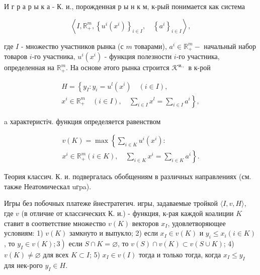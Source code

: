 \documentclass[10pt]{article}
\begin{document}
И г р а р ы к а - К. и., порожденная р ы н к м, к-рый понимается как система



\[

\left\langle I, \mathbb{R}_{+}^{m},\left\{u^{i}\left(x^{i}\right)\right\}_{i \in I}, \quad\left\{a^{i}\right\}_{i \in I}\right\rangle,

\]



где $I$ - множество участников рынка (с $m$ товарами), $a^{i} \in \mathbb{R}_{+}^{m}-$ начальный набор товаров $i$-го участника, $u^{i}\left(x^{i}\right)$ - функция полезности $i$-го участника, определенная на $\mathbb{R}_{+}^{m}$. На основе әтого рынка строится $\mathcal{K}^{\text {и., }}$ в к-рой



\[

\begin{gathered}

H=\left\{y_{I}: y_{i}=u^{l}\left(x^{i}\right) \quad(i \in I),\right. \\

\left.x^{i} \in \mathbb{R}_{+}^{m} \quad(i \in I), \quad \sum_{i \in I} x^{l}=\sum_{i \in I} a^{i}\right\},

\end{gathered}

\]



a характеристіч. функция определяется равенством



\[

\begin{gathered}

v(K)=\max \left\{\sum_{i \in K} u^{i}\left(x^{i}\right):\right. \\

\left.x^{i} \in \mathbb{R}_{+}^{m}(i \in K), \quad \sum_{i \in K} x^{i}=\sum_{i \in K} a^{i}\right\} .

\end{gathered}

\]



Теория классич. К. и. подвергалась обобщениям в различных направлениях (см. также Неатомическал uгpa).



Игры без побочных платеже йнестратегич. игры, задаваемые тройкой $\langle I, v, H\rangle$, где $v$ (в отличие от классических К. и.) - функция, к-рая каждой коалиции $K$ ставит в соответствие множество $v(K)$ векторов $x_{I}$, удовлетворяющее условиям: 1) $v(K)$ замкнуто и выпукло; 2) если $x_{I} \in v(K)$ и $y_{i} \leqslant x_{i}(i \in K)$, то $\left.y_{I} \in v(K) ; 3\right)$ если $S \cap K=\varnothing$, то $v(S) \cap v(K) \subset v(S \cup K)$; 4) $v(K) \neq \varnothing$ для всех $K \subset I$; 5) $x_{I} \in v(I)$ тогда и только тогда, когда $x_{I} \leqslant y_{I}$ для нек-рого $y_{I} \in H$.
\end{document}
